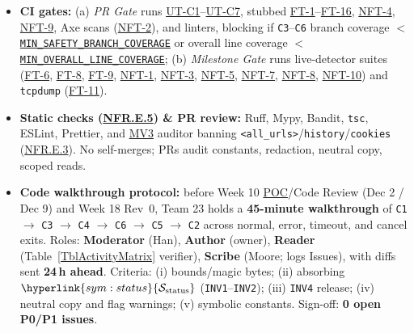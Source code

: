 \documentclass[12pt, titlepage]{article}
\newcommand{\MinSafetyBranchCov}{\hyperref[const:MIN_SAFETY_BRANCH_COVERAGE]{\texttt{MIN\_\allowbreak{}SAFETY\_\allowbreak{}BRANCH\_\allowbreak{}COVERAGE}}}
\newcommand{\MinOverallLineCov}{\hyperref[const:MIN_OVERALL_LINE_COVERAGE]{\texttt{MIN\_\allowbreak{}OVERALL\_\allowbreak{}LINE\_\allowbreak{}COVERAGE}}}
\newcommand{\SymStatus}{\hyperlink{sym:status}{\mathcal{S}_{\text{status}}}}
\newcommand{\MVThree}{\hyperlink{vnv-acr-mv3}{MV3}}
\newcommand{\POC}{\hyperlink{vnv-acr-poc}{POC}}
\begin{document}
\begin{itemize}[leftmargin=*, itemsep=0.5pt, topsep=2pt]
    \item \textbf{CI gates:} (a) \emph{PR Gate} runs \hyperref[ut:C1]{UT-C1}--\hyperref[ut:C7]{UT-C7}, stubbed \hyperref[test:FT-1]{FT-1}--\hyperref[test:FT-16]{FT-16}, \hyperref[test:NFT-4]{NFT-4}, \hyperref[test:NFT-9]{NFT-9}, Axe scans (\hyperref[test:NFT-2]{NFT-2}), and linters, blocking if \texttt{C3}--\texttt{C6} branch coverage $<$ \MinSafetyBranchCov{} or overall line coverage $<$ \MinOverallLineCov{}; (b) \emph{Milestone Gate} runs live-detector suites (\hyperref[test:FT-6]{FT-6}, \hyperref[test:FT-8]{FT-8}, \hyperref[test:FT-9]{FT-9}, \hyperref[test:NFT-1]{NFT-1}, \hyperref[test:NFT-3]{NFT-3}, \hyperref[test:NFT-5]{NFT-5}, \hyperref[test:NFT-7]{NFT-7}, \hyperref[test:NFT-8]{NFT-8}, \hyperref[test:NFT-10]{NFT-10}) and \texttt{tcpdump} (\hyperref[test:FT-11]{FT-11}).
    \item \textbf{Static checks (\hyperref[req:NFR.E.5]{NFR.E.5}) \& PR review:} Ruff, Mypy, Bandit, \texttt{tsc}, ESLint, Prettier, and \MVThree{} auditor banning \texttt{<all\_urls>}/\texttt{history}/\texttt{cookies} (\hyperref[req:NFR.E.3]{NFR.E.3}). No self-merges; PRs audit constants, redaction, neutral copy, scoped reads.
    \item \textbf{Code walkthrough protocol:} before Week 10 \POC{}/Code Review (Dec 2 / Dec 9) and Week 18 Rev~0, Team 23 holds a \textbf{45-minute walkthrough} of \texttt{C1} $\to$ \texttt{C3} $\to$ \texttt{C4} $\to$ \texttt{C6} $\to$ \texttt{C5} $\to$ \texttt{C2} across normal, error, timeout, and cancel exits. Roles: \textbf{Moderator} (Han), \textbf{Author} (owner), \textbf{Reader} (Table~\ref{TblActivityMatrix} verifier), \textbf{Scribe} (Moore; logs Issues), with diffs sent \textbf{24\,h ahead}. Criteria: (i) bounds/magic bytes; (ii) absorbing $\SymStatus$ (\texttt{INV1}--\texttt{INV2}); (iii) \texttt{INV4} release; (iv) neutral copy and flag warnings; (v) symbolic constants. Sign-off: \textbf{0 open P0/P1 issues}.
\end{itemize}
\end{document}
